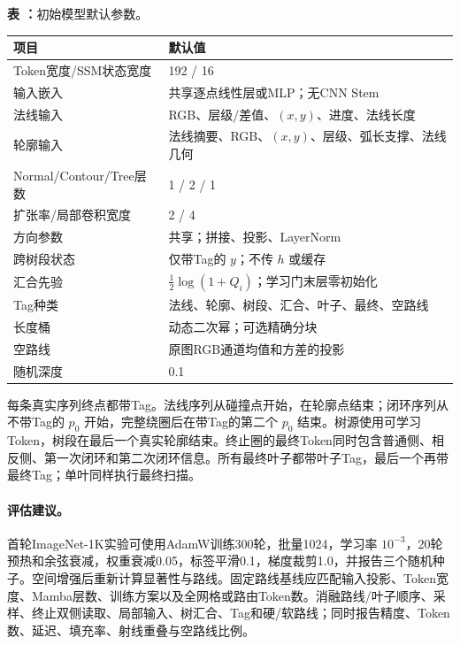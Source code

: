 \begin{center}
\label{tab:model-defaults}
\begin{minipage}{\columnwidth}
\centering
\small\textbf{表 \thetable：}初始模型默认参数。

\vspace{2pt}
\scriptsize
\begin{tabular}{@{}p{}p{}@{}}
\toprule
项目 & 默认值 \\
\midrule
Token宽度/SSM状态宽度 & 192 / 16 \\
输入嵌入 & 共享逐点线性层或MLP；无CNN Stem \\
法线输入 & RGB、层级/差值、$(x,y)$、进度、法线长度 \\
轮廓输入 & 法线摘要、RGB、$(x,y)$、层级、弧长支撑、法线几何 \\
Normal/Contour/Tree层数 & 1 / 2 / 1 \\
扩张率/局部卷积宽度 & 2 / 4 \\
方向参数 & 共享；拼接、投影、LayerNorm \\
跨树段状态 & 仅带Tag的 $y$；不传 $h$ 或缓存 \\
汇合先验 & $\tfrac12\log(1+Q_i)$；学习门末层零初始化 \\
Tag种类 & 法线、轮廓、树段、汇合、叶子、最终、空路线 \\
长度桶 & 动态二次幂；可选精确分块 \\
空路线 & 原图RGB通道均值和方差的投影 \\
随机深度 & 0.1 \\
\bottomrule
\end{tabular}
\end{minipage}
\end{center}

每条真实序列终点都带Tag。法线序列从碰撞点开始，在轮廓点结束；闭环序列从不带Tag的 $p_0$ 开始，完整绕圈后在带Tag的第二个 $p_0$ 结束。树源使用可学习Token，树段在最后一个真实轮廓结束。终止圈的最终Token同时包含普通侧、相反侧、第一次闭环和第二次闭环信息。所有最终叶子都带叶子Tag，最后一个再带最终Tag；单叶同样执行最终扫描。

\paragraph{评估建议。}
首轮ImageNet-1K实验可使用AdamW训练300轮，批量1024，学习率 $10^{-3}$，20轮预热和余弦衰减，权重衰减0.05，标签平滑0.1，梯度裁剪1.0，并报告三个随机种子。空间增强后重新计算显著性与路线。固定路线基线应匹配输入投影、Token宽度、Mamba层数、训练方案以及全网格或路由Token数。消融路线/叶子顺序、采样、终止双侧读取、局部输入、树汇合、Tag和硬/软路线；同时报告精度、Token数、延迟、填充率、射线重叠与空路线比例。

\normalsize
